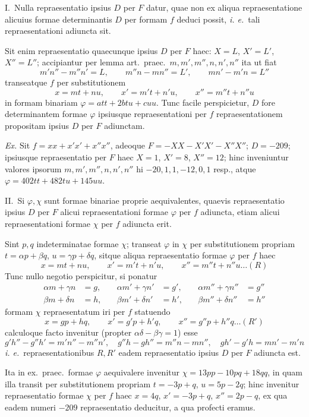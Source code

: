 I.\ Nulla repraesentatio ipsius $D$ per $F$ datur, quae non ex aliqua
repraesentatione alicuius formae determinantis $D$ per formam $f$ deduci possit,
\textit{i. e.}\ tali repraesentationi adiuncta sit.

Sit enim repraesentatio quaecunque ipsius $D$ per $F$ haec: $X=L$, $X'=L'$,
$X''=L''$; accipiantur per lemma art.\ praec.\ $m,m',m'',n,n',n''$ ita ut fiat
\[
m'n''-m''n'=L,\qquad m''n-mn''=L',\qquad mn'-m'n=L''
\]
transeatque $f$ per substitutionem
\[
x=mt+nu,\qquad x'=m't+n'u,\qquad x''=m''t+n''u
\]
in formam binariam $\varphi=att+2btu+cuu$. Tunc facile perspicietur, $D$ fore
determinantem formae $\varphi$ ipsiusque repraesentationi per $f$ repraesentationem
propositam ipsius $D$ per $F$ adiunctam.

\textit{Ex.} Sit $f=xx+x'x'+x''x''$, adeoque $F=-XX-X'X'-X''X''$;
$D=-209$; ipsiusque repraesentatio per $F$ haec $X=1$, $X'=8$, $X''=12$;
hinc inveniuntur valores ipsorum $m,m',m'',n,n',n''$ hi $-20,1,1,-12,0,1$
resp., atque $\varphi=402tt+482tu+145uu$.

II.\ Si $\varphi,\chi$ sunt formae binariae proprie aequivalentes, quaevis
repraesentatio ipsius $D$ per $F$ alicui repraesentationi formae $\varphi$ per $f$
adiuncta, etiam alicui repraesentationi formae $\chi$ per $f$ adiuncta erit.

Sint $p,q$ indeterminatae formae $\chi$; transeat $\varphi$ in $\chi$ per
substitutionem propriam $t=\alpha p+\beta q$, $u=\gamma p+\delta q$, sitque
aliqua repraesentatio formae $\varphi$ per $f$ haec
\[
x=mt+nu,\qquad x'=m't+n'u,\qquad x''=m''t+n''u\ldots(R)
\]
Tunc nullo negotio perspicitur, si ponatur
\[
\begin{aligned}
\alpha m+\gamma n&=g,&\quad \alpha m'+\gamma n'&=g',&\quad \alpha m''+\gamma n''&=g''\\
\beta m+\delta n&=h,&\quad \beta m'+\delta n'&=h',&\quad \beta m''+\delta n''&=h''
\end{aligned}
\]
formam $\chi$ repraesentatum iri per $f$ statuendo
\[
x=gp+hq,\qquad x'=g'p+h'q,\qquad x''=g''p+h''q\ldots(R')
\]
calculoque facto invenitur (propter $\alpha\delta-\beta\gamma=1$) esse
\[
g'h''-g''h'=m'n''-m''n',\quad
g''h-gh''=m''n-mn'',\quad
gh'-g'h=mn'-m'n
\]
\textit{i. e.}\ repraesentationibus $R,R'$ eadem repraesentatio ipsius $D$ per
$F$ adiuncta est.

Ita in ex.\ praec.\ formae $\varphi$ aequivalere invenitur
$\chi=13pp-10pq+18qq$, in quam illa transit per substitutionem propriam
$t=-3p+q$, $u=5p-2q$; hinc invenitur repraesentatio formae $\chi$ per $f$ haec
$x=4q$, $x'=-3p+q$, $x''=2p-q$, ex qua eadem numeri $-209$ repraesentatio
deducitur, a qua profecti eramus.

